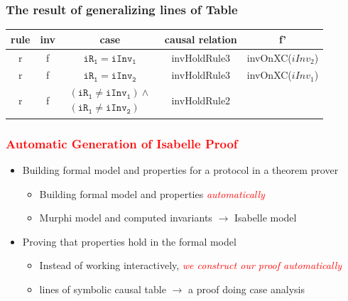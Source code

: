 \documentclass{beamer}
\def \eqc {= }
\def \iInv {iInv}
\def \iR {iR}
\newcommand\JP[1]{\textcolor{red}{#1}}
\begin{document}
\begin{frame}\frametitle{The result of generalizing lines of Table}
 \begin{table}[htbp]
\begin{tabular}{|c|c|c|c|c|  }
\hline
  rule&inv&case & causal relation &   f'  \\
\hline

  r& f& $\mathtt{\iR_1} \eqc \mathtt{\iInv_1}$ & invHoldRule3 &invOnXC($\iInv_2$) \\
\hline
  r &f& $\mathtt{\iR_1} \eqc \mathtt{\iInv_2}$ & invHoldRule3 &invOnXC($\iInv_1$)  \\
\hline
   r & f & $\left.
\begin{array}{c}
(\mathtt{\iR_1} \ne \mathtt{\iInv_1})\wedge \\
(\mathtt{\iR_1} \ne \mathtt{\iInv_2})
\end{array}%
\right. $ &invHoldRule2  & \\
\hline

\end{tabular}
\end{table}
\end{frame}

\begin{frame}\frametitle{\JP{Automatic Generation of Isabelle Proof}}

\begin{itemize}
\item Building formal model and  properties for a protocol  in a theorem prover

\begin{itemize}
\item Building formal model and  properties \JP{\emph{automatically}}

\item Murphi model and computed  invariants $\longrightarrow$  Isabelle model
\end{itemize}

\item Proving that properties hold in the formal model
\begin{itemize}
\item Instead of working interactively,\JP{\emph{ we construct our proof automatically}}

\item lines of symbolic causal table $\longrightarrow$ a proof doing case analysis
\end{itemize}
\end{itemize}
\end{frame}
\end{document}
